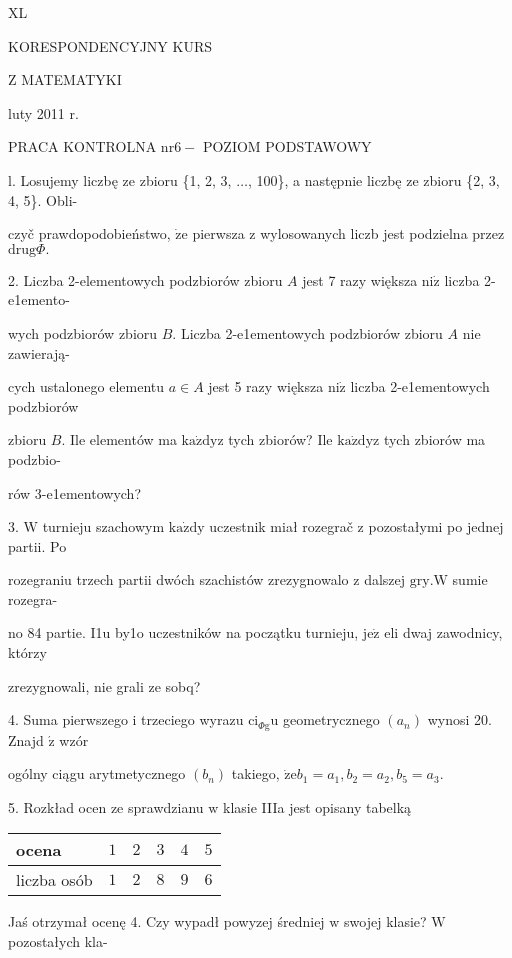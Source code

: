 \documentclass[a4paper,12pt]{article}
\begin{document}
XL

KORESPONDENCYJNY KURS

Z MATEMATYKI

luty 2011 r.

PRACA KONTROLNA $\mathrm{n}\mathrm{r} 6-$ POZIOM PODSTAWOWY

l. Losujemy liczbę ze zbioru \{1, 2, 3, $\ldots$, 100\}, a następnie liczbę ze zbioru \{2, 3, 4, 5\}. Obli-

czyč prawdopodobieństwo, $\dot{\mathrm{z}}\mathrm{e}$ pierwsza $\mathrm{z}$ wylosowanych liczb jest podzielna przez $\mathrm{d}\mathrm{r}\mathrm{u}\mathrm{g}\Phi.$

2. Liczba 2-elementowych podzbiorów zbioru $A$ jest 7 razy większa $\mathrm{n}\mathrm{i}\dot{\mathrm{z}}$ liczba 2-e1emento-

wych podzbiorów zbioru $B$. Liczba 2-e1ementowych podzbiorów zbioru $A$ nie zawierają-

cych ustalonego elementu $a\in A$ jest 5 razy większa $\mathrm{n}\mathrm{i}\dot{\mathrm{z}}$ liczba 2-e1ementowych podzbiorów

zbioru $B$. Ile elementów ma $\mathrm{k}\mathrm{a}\dot{\mathrm{z}}\mathrm{d}\mathrm{y}\mathrm{z}$ tych zbiorów? Ile $\mathrm{k}\mathrm{a}\dot{\mathrm{z}}\mathrm{d}\mathrm{y}\mathrm{z}$ tych zbiorów ma podzbio-

rów 3-e1ementowych?

3. $\mathrm{W}$ turnieju szachowym $\mathrm{k}\mathrm{a}\dot{\mathrm{z}}\mathrm{d}\mathrm{y}$ uczestnik miał rozegrač $\mathrm{z}$ pozostałymi po jednej partii. Po

rozegraniu trzech partii dwóch szachistów zrezygnowalo $\mathrm{z}$ dalszej $\mathrm{g}\mathrm{r}\mathrm{y}. \mathrm{W}$ sumie rozegra-

no 84 partie. I1u by1o uczestników na początku turnieju, $\mathrm{j}\mathrm{e}\dot{\mathrm{z}}$ eli dwaj zawodnicy, którzy

zrezygnowali, nie grali ze sobq?

4. Suma pierwszego $\mathrm{i}$ trzeciego wyrazu $\mathrm{c}\mathrm{i}_{\Phi \mathrm{g}}\mathrm{u}$ geometrycznego $(a_{n})$ wynosi 20. Znajd $\acute{\mathrm{z}}$ wzór

ogólny ciągu arytmetycznego $(b_{n})$ takiego, $\dot{\mathrm{z}}\mathrm{e}b_{1}=a_{1}, b_{2}=a_{2}, b_{5}=a_{3}.$

5. Rozkład ocen ze sprawdzianu $\mathrm{w}$ klasie IIIa jest opisany tabelką
\begin{center}
\begin{tabular}{l|l|l|l|l|l}
\multicolumn{1}{l|}{ocena}&	\multicolumn{1}{|l|}{$1$}&	\multicolumn{1}{|l|}{ $2$}&	\multicolumn{1}{|l|}{ $3$}&	\multicolumn{1}{|l|}{ $4$}&	\multicolumn{1}{|l}{ $5$}	\\
\hline
\multicolumn{1}{l|}{liczba osób}&	\multicolumn{1}{|l|}{$1$}&	\multicolumn{1}{|l|}{ $2$}&	\multicolumn{1}{|l|}{ $8$}&	\multicolumn{1}{|l|}{ $9$}&	\multicolumn{1}{|l}{ $6$}
\end{tabular}

\end{center}
Jaś otrzymał ocenę 4. Czy wypadł powyzej średniej $\mathrm{w}$ swojej klasie? $\mathrm{W}$ pozostałych kla-
\end{document}
